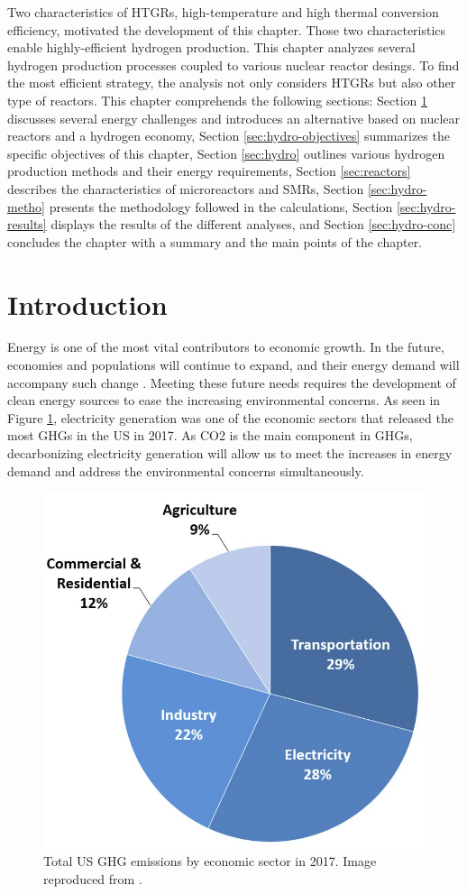\label{ch:hydro}

Two characteristics of HTGRs, high-temperature and high thermal conversion efficiency, motivated the development of this chapter.
Those two characteristics enable highly-efficient hydrogen production.
This chapter analyzes several hydrogen production processes coupled to various nuclear reactor desings.
To find the most efficient strategy, the analysis not only considers HTGRs but also other type of reactors.
This chapter comprehends the following sections:
Section \ref{sec:hydro-intro} discusses several energy challenges and introduces an alternative based on nuclear reactors and a hydrogen economy,
Section \ref{sec:hydro-objectives} summarizes the specific objectives of this chapter,
Section \ref{sec:hydro} outlines various hydrogen production methods and their energy requirements, 
Section \ref{sec:reactors} describes the characteristics of microreactors and \glspl{SMR},
Section \ref{sec:hydro-metho} presents the methodology followed in the calculations, 
Section \ref{sec:hydro-results} displays the results of the different analyses,
and Section \ref{sec:hydro-conc} concludes the chapter with a summary and the main points of the chapter.

\section{Introduction}
\label{sec:hydro-intro}

Energy is one of the most vital contributors to economic growth.
In the future, economies and populations will continue to expand, and their energy demand will accompany such change \cite{burke_impact_2018} \cite{el-shafie_hydrogen_2019}.
Meeting these future needs requires the development of clean energy sources to ease the increasing environmental concerns.
As seen in Figure \ref{fig:ghg}, electricity generation was one of the economic sectors that released the most \glspl{GHG} in the \gls{US} in 2017.
As \gls{CO2} is the main component in \glspl{GHG}, decarbonizing electricity generation will allow us to meet the increases in energy demand and address the environmental concerns simultaneously.

\begin{figure}[htbp!]
	\centering
	\includegraphics[width=0.4\linewidth]{figures-hydro/total-ghg-2017.png}
	\hfill
	\caption{Total US GHG emissions by economic sector in 2017. Image reproduced from \cite{us_epa_sources_2020}.}
	\label{fig:ghg}
\end{figure}

